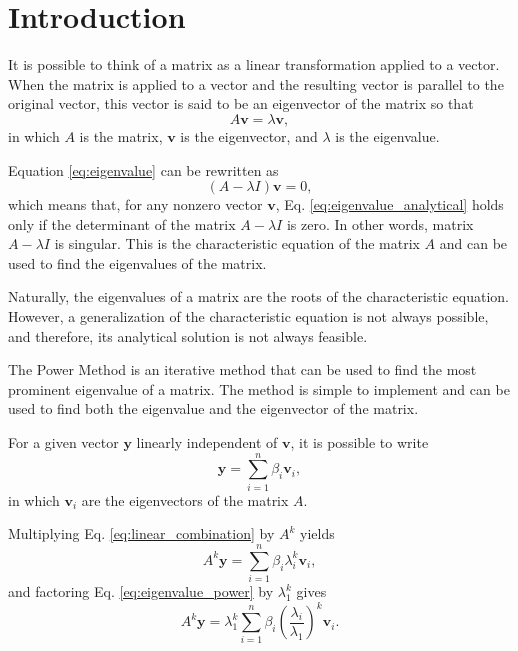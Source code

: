 \section{Introduction} \label{sec:introduction}
It is possible to think of a matrix as a linear transformation applied to a vector. When the matrix is applied to a vector and the resulting vector is parallel to the original vector, this vector is said to be an eigenvector of the matrix so that 
\begin{equation}
    A\mathbf{v} = \lambda \mathbf{v},
    \label{eq:eigenvalue}
\end{equation}
in which $A$ is the matrix, $\mathbf{v}$ is the eigenvector, and $\lambda$ is the eigenvalue. 

Equation \eqref{eq:eigenvalue} can be rewritten as
\begin{equation}
    (A - \lambda I)\mathbf{v} = 0,
    \label{eq:eigenvalue_analytical}
\end{equation}
which means that, for any nonzero vector $\mathbf{v}$, Eq. \eqref{eq:eigenvalue_analytical} holds only if the determinant of the matrix $A - \lambda I$ is zero. In other words, matrix $A - \lambda I$ is singular. This is the characteristic equation of the matrix $A$ and can be used to find the eigenvalues of the matrix. 

Naturally, the eigenvalues of a matrix are the roots of the characteristic equation. However, a generalization of the characteristic equation is not always possible, and therefore, its analytical solution is not always feasible. 

The Power Method is an iterative method that can be used to find the most prominent eigenvalue of a matrix. The method is simple to implement and can be used to find both the eigenvalue and the eigenvector of the matrix. 

For a given vector $\mathbf{y}$ linearly independent of $\mathbf{v}$, it is possible to write
\begin{equation}
    \mathbf{y} = \sum_{i=1}^{n}\beta_i\mathbf{v}_i,
    \label{eq:linear_combination}
\end{equation}
in which $\mathbf{v}_i$ are the eigenvectors of the matrix $A$. 

Multiplying Eq. \eqref{eq:linear_combination} by $A^k$ yields
\begin{equation}
    A^k\mathbf{y} = \sum_{i=1}^{n}\beta_i\lambda_i^k\mathbf{v}_i,
    \label{eq:eigenvalue_power}
\end{equation}
and factoring Eq. \eqref{eq:eigenvalue_power} by $\lambda_1^k$ gives
\begin{equation}
    {A^k\mathbf{y}} = {\lambda_1^k}\sum_{i=1}^{n}\beta_i\left(\frac{\lambda_i}{\lambda_1}\right)^k\mathbf{v}_i.
    \label{eq:eigenvalue_power_factor}
\end{equation}

